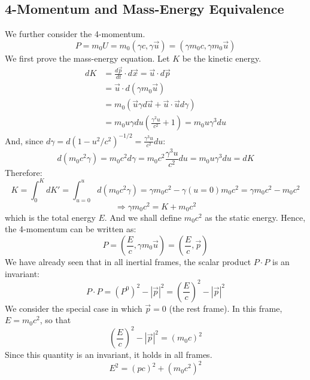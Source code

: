 \documentclass{article}
\begin{document}
	\subsection*{4-Momentum and Mass-Energy Equivalence}
	We further consider the 4-momentum.
	\begin{equation}
		P = m_0 U = m_0(\gamma c, \gamma \vec{u}) = (\gamma m_0 c, \gamma m_0 \vec{u})
	\end{equation}
	We first prove the mass-energy equation.
	Let $K$ be the kinetic energy.
	\begin{align*}
		dK &= \frac{d\vec{p}}{dt} \cdot d\vec{x} = \vec{u} \cdot d\vec{p} \\
		&= \vec{u} \cdot d(\gamma m_0 \vec{u}) \\
		&= m_0 (\vec{u} \gamma d\vec{u} + \vec{u} \cdot \vec{u} d\gamma) \\
		&= m_0 u \gamma du \left(\frac{\gamma^2 u}{c^2} + 1\right) = m_0 u \gamma^3 du
	\end{align*}
	And, since $d\gamma = d(1-u^2/c^2)^{-1/2} = \frac{\gamma^3 u}{c^2}du$:
	\begin{equation*}
		d(m_0 c^2 \gamma) = m_0 c^2 d\gamma = m_0 c^2 \frac{\gamma^3 u}{c^2} du = m_0 u \gamma^3 du = dK
	\end{equation*}
	Therefore:
	\begin{equation*}
		K = \int_0^K dK' = \int_{u=0}^{u} d(m_0 c^2 \gamma) = \gamma m_0 c^2 - \gamma(u=0)m_0 c^2 = \gamma m_0 c^2 - m_0 c^2
	\end{equation*}
	\begin{equation}
		\Rightarrow \gamma m_0 c^2 = K + m_0 c^2
	\end{equation}
	which is the total energy $E$. And we shall define $m_0 c^2$ as the static energy.
	Hence, the 4-momentum can be written as:
	\begin{equation}
		P = \left(\frac{E}{c}, \gamma m_0 \vec{u}\right) = \left(\frac{E}{c}, \vec{p}\right)
	\end{equation}
	We have already seen that in all inertial frames, the scalar product $P \cdot P$ is an invariant:
	\begin{equation*}
		P \cdot P = (P^0)^2 - |\vec{p}|^2 = \left(\frac{E}{c}\right)^2 - |\vec{p}|^2
	\end{equation*}
	We consider the special case in which $\vec{p}=0$ (the rest frame). In this frame, $E=m_0c^2$, so that
	\begin{equation*}
		\left(\frac{E}{c}\right)^2 - |\vec{p}|^2 = (m_0 c)^2
	\end{equation*}
	Since this quantity is an invariant, it holds in all frames.
	\begin{equation}
		E^2 = (pc)^2 + (m_0 c^2)^2
	\end{equation}
\end{document}
